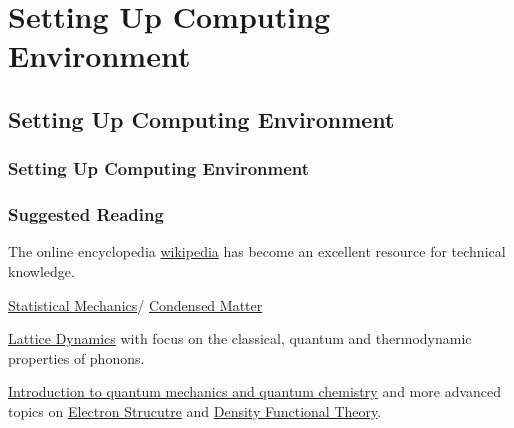 \chapter{Setting Up Computing Environment}

\section{Setting Up Computing Environment}

\subsection{Setting Up Computing Environment}

\subsection{Suggested Reading}


The online encyclopedia \href{http://www.wikipedia.org/}{wikipedia} 
has become an excellent resource for technical knowledge. 

\href{http://en.wikipedia.org/wiki/Statistical_mechanics}
{Statistical Mechanics}/
\href{http://en.wikipedia.org/wiki/Condensed_matter}
{Condensed Matter}
\cite{ashcroft_solid_1976,mcquarrie_statistical_2000}

\href{http://en.wikipedia.org/wiki/Phonon}
{Lattice Dynamics} with focus on the classical, quantum 
and thermodynamic properties of phonons.\cite{peierls_,ziman,
wallace_thermodynamics_1976,
srivastava_1990,dove_lattice_1993} 

\href{http://en.wikipedia.org/wiki/Introduction_to_quantum_mechanics}{Introduction to quantum mechanics and quantum chemistry}
\cite{griffiths_introduction_1995} 
and more 
advanced topics on 
\href{https://en.wikipedia.org/wiki/Electron_configuration}
{Electron Strucutre} and 
\href{http://en.wikipedia.org/wiki/Density_functional_theory}
{Density Functional Theory}.
\cite{martin_electronic_2004} 

